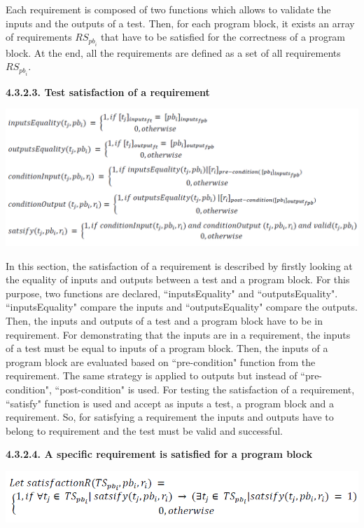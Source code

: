 \documentclass[conference,compsoc]{IEEEtran}
\begin{document}
Each requirement is composed of two functions which allows to validate the inputs and the outputs of a test. Then, for each program block, it exists an array of requirements ${RS}_{{pb}_{i}}$ that have to be satisfied for the correctness of a program block. At the end, all the requirements are defined as a set of all requirements ${RS}_{{pb}_{i}}$. 

\noindent
\newline
\textbf{4.3.2.3. Test satisfaction of a requirement}
\begin{center}
\includegraphics[scale=0.4]{Proof2-Part3.png} 
\end{center}

In this section, the satisfaction of a requirement is described by firstly looking at the equality of inputs and outputs between a test and a program block. For this purpose, two functions are declared, ``inputsEquality" and ``outputsEquality". ``inputsEquality" compare the inputs and ``outputsEquality" compare the outputs. 
\newline
Then, the inputs and outputs of a test and a program block have to be in requirement. For demonstrating that the inputs are in a requirement, the inputs of a test must be equal to inputs of a program block. Then, the inputs of a program block are evaluated based on ``pre-condition" function from the requirement. The same strategy is applied to outputs but instead of ``pre-condition", ``post-condition" is used. 
\newline
For testing the satisfaction of a requirement, ``satisfy" function is used and accept as inputs a test, a program block and a requirement. So, for satisfying a requirement the inputs and outputs have to belong to requirement and the test must be valid and successful. 


\noindent
\newline
\textbf{4.3.2.4. A specific requirement is satisfied for a program block}
\begin{center}
\includegraphics[scale=0.5]{Proof2-Part4.png} 
\end{center}
\end{document}
